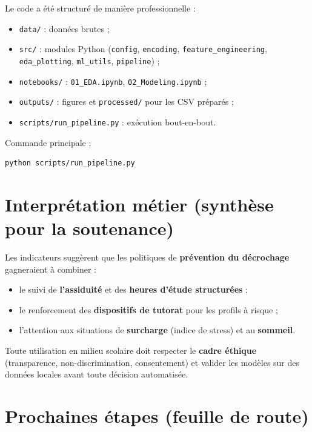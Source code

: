 \documentclass[a4paper,11pt]{article}
\begin{document}
Le code a été structuré de manière professionnelle :
\begin{itemize}[leftmargin=*]
  \item \texttt{data/} : données brutes ;
  \item \texttt{src/} : modules Python (\texttt{config}, \texttt{encoding}, \texttt{feature\_engineering}, \texttt{eda\_plotting}, \texttt{ml\_utils}, \texttt{pipeline}) ;
  \item \texttt{notebooks/} : \texttt{01\_EDA.ipynb}, \texttt{02\_Modeling.ipynb} ;
  \item \texttt{outputs/} : figures et \texttt{processed/} pour les CSV préparés ;
  \item \texttt{scripts/run\_pipeline.py} : exécution bout-en-bout.
\end{itemize}

\noindent Commande principale :
\begin{verbatim}
python scripts/run_pipeline.py
\end{verbatim}

\section{Interprétation métier (synthèse pour la soutenance)}

Les indicateurs suggèrent que les politiques de \textbf{prévention du décrochage} gagneraient à combiner :
\begin{itemize}[leftmargin=*]
  \item le suivi de \textbf{l'assiduité} et des \textbf{heures d'étude structurées} ;
  \item le renforcement des \textbf{dispositifs de tutorat} pour les profils à risque ;
  \item l'attention aux situations de \textbf{surcharge} (indice de stress) et au \textbf{sommeil}.
\end{itemize}
Toute utilisation en milieu scolaire doit respecter le \textbf{cadre éthique} (transparence, non-discrimination, consentement) et valider les modèles sur des données locales avant toute décision automatisée.

\section{Prochaines étapes (feuille de route)}
\end{document}
